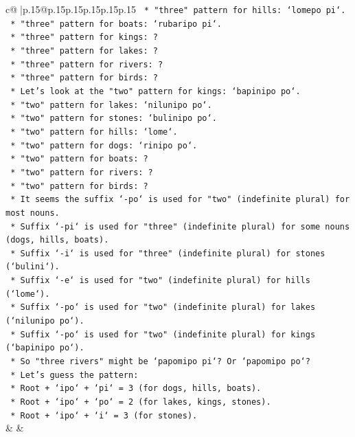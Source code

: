 \documentclass{article}
\begin{document}
{\begin{supertabular}{c@{$\;$}|p{.15\linewidth}@{}p{.15\linewidth}p{.15\linewidth}p{.15\linewidth}p{.15\linewidth}p{.15\linewidth}}
{{{\texttt{                *   "three" pattern for hills: `lomepo pi`.} \\
\texttt{                *   "three" pattern for boats: `rubaripo pi`.} \\
\texttt{                *   "three" pattern for kings: ?} \\
\texttt{                *   "three" pattern for lakes: ?} \\
\texttt{                *   "three" pattern for rivers: ?} \\
\texttt{                *   "three" pattern for birds: ?} \\
\texttt{                *   Let's look at the "two" pattern for kings: `bapinipo po`.} \\
\texttt{                *   "two" pattern for lakes: `nilunipo po`.} \\
\texttt{                *   "two" pattern for stones: `bulinipo po`.} \\
\texttt{                *   "two" pattern for hills: `lome`.} \\
\texttt{                *   "two" pattern for dogs: `rinipo po`.} \\
\texttt{                *   "two" pattern for boats: ?} \\
\texttt{                *   "two" pattern for rivers: ?} \\
\texttt{                *   "two" pattern for birds: ?} \\
\texttt{                *   It seems the suffix `{-}po` is used for "two" (indefinite plural) for most nouns.} \\
\texttt{                *   Suffix `{-}pi` is used for "three" (indefinite plural) for some nouns (dogs, hills, boats).} \\
\texttt{                *   Suffix `{-}i` is used for "three" (indefinite plural) for stones (`bulini`).} \\
\texttt{                *   Suffix `{-}e` is used for "two" (indefinite plural) for hills (`lome`).} \\
\texttt{                *   Suffix `{-}po` is used for "two" (indefinite plural) for lakes (`nilunipo po`).} \\
\texttt{                *   Suffix `{-}po` is used for "two" (indefinite plural) for kings (`bapinipo po`).} \\
\texttt{                *   So "three rivers" might be `papomipo pi`? Or `papomipo po`?} \\
\texttt{                *   Let's guess the pattern:} \\
\texttt{                    *   Root + `ipo` + `pi` = 3 (for dogs, hills, boats).} \\
\texttt{                    *   Root + `ipo` + `po` = 2 (for lakes, kings, stones).} \\
\texttt{                    *   Root + `ipo` + `i` = 3 (for stones).} \\
            }
        }
    }
    & & \\ \\


\end{supertabular}}
\end{document}
